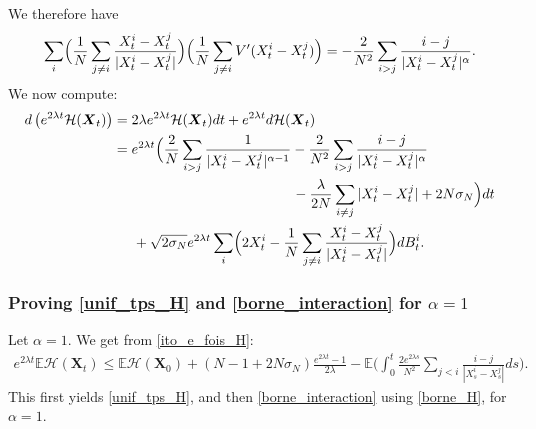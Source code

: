 \documentclass[10pt]{amsart}
\newcommand{\bX}{{\boldsymbol{X}}}
\theoremstyle{plain}
\theoremstyle{definition}
\begin{document}
We therefore have
\[
\sum_i\Bigl(\frac{1}{N}\sum_{j\neq i}\frac{X^i_t-X^j_t}{|X^i_t-X^j_t|}\Bigr)\Bigl(\frac{1}{N}\sum_{j\neq i}V'(X^i_t-X^j_t)\Bigr)=-\frac{2}{N^2}\sum_{i>j}\frac{i-j}{|X^i_t-X^j_t|^{\alpha}}.
\]
We now compute:
\begin{equation}\label{ito_e_fois_H}
\begin{aligned}
d\left(e^{2\lambda t}\mathcal{H}(\bX_t)\right)&=2\lambda e^{2\lambda t}\mathcal{H}(\bX_t)dt+e^{2\lambda t}d\mathcal{H}(\bX_t)\\
&=e^{2\lambda t}\Bigl(\frac{2}{N}\sum_{i>j}\frac{1}{|X^i_t-X^j_t|^{\alpha-1}}-\frac{2}{N^2}\sum_{i>j}\frac{i-j}{|X^i_t-X^j_t|^{\alpha}}\\
&\hspace*{4.5cm}-\frac{\lambda}{2N}\sum_{i\neq j}|X^i_t-X^j_t|+2N\sigma_N\Bigr)dt\\
&\hspace*{.5cm}+\sqrt{2\sigma_N}e^{2\lambda t}\sum_i\Bigl(2X^i_t-\frac{1}{N}\sum_{j\neq i}\frac{X^i_t-X^j_t}{|X^i_t-X^j_t|}\Bigr)dB^i_t.
\end{aligned}
\end{equation}

\subsubsection*{Proving \eqref{unif_tps_H} and \eqref{borne_interaction} for $\alpha=1$} Let $\alpha=1$. We get from \eqref{ito_e_fois_H}:
\begin{align*}
e^{2\lambda t}\mathbb{E}\mathcal{H}(\bX_t)\leq \mathbb{E}\mathcal{H}(\bX_0)\!+\!(N\!-\!1\!+\!2N\sigma_N)\frac{e^{2\lambda t}-1}{2\lambda}-\mathbb{E}\biggl(\int_0^t\!\frac{2e^{2\lambda s}}{N^2}\sum_{j<i}\frac{i-j}{|X^i_s-X^j_s|}ds\biggr).
\end{align*}
This first yields \eqref{unif_tps_H}, and then \eqref{borne_interaction} using \eqref{borne_H}, for $\alpha=1$.
\end{document}
